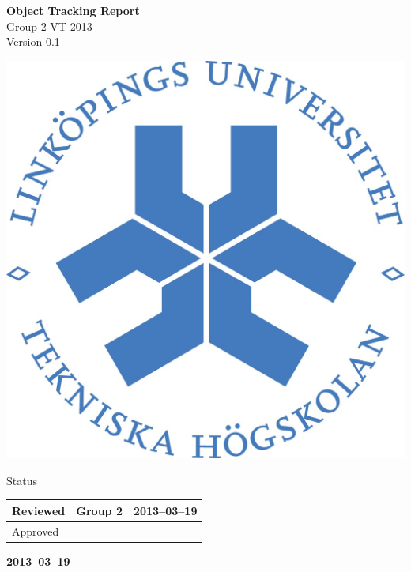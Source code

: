 \documentclass[pdftex, fontsize=11pt, a4paper]{scrbook}
\begin{document}
\begin{titlepage}
\thispagestyle{empty}
\begin{center}
	\vspace*{4\baselineskip}

	\textbf{\huge Object Tracking Report} \\
	\vspace*{0.5\baselineskip}
	{\large  Group 2 VT 2013} \\
	\vspace*{0.5\baselineskip}
	{\large  Version 0.1}


	\vspace*{6\baselineskip}
	\includegraphics[width=0.4\linewidth]{lith_sigill_col}


	\normalfont
	\small
	\vfill


	{\large  Status} \\
	\vspace*{1\baselineskip}
	\begin{tabular}{|p{4cm}|p{4cm}|p{4cm}|}
		\hline
		Reviewed & Group 2 & 2013--03--19 \\
		\hline
		Approved &   &    \\
		\hline
	\end{tabular}


	\vspace*{2\baselineskip}

	\textbf{2013--03--19} \\
	[2\baselineskip]
\end{center}

\end{titlepage}
\end{document}
